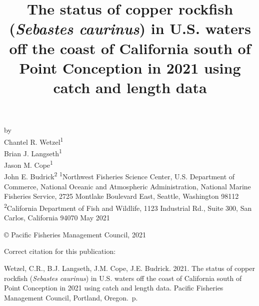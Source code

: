 \documentclass[11pt,
  english,
  a4paper,
]{article}
\date{}
\newcommand{\trTitle}{The status of copper rockfish (\emph{Sebastes caurinus}) in U.S. waters off the coast of California south of Point Conception in 2021 using catch and length data}
\newcommand{\trYear}{2021}
\newcommand{\trMonth}{May}
\newcommand{\trAuthsBack}{Wetzel, C.R., B.J. Langseth, J.M. Cope, J.E. Budrick}
\newcommand{\trCitation}{
\begin{hangparas}{1em}{1}
\trAuthsBack{}. \trYear{}. \trTitle{}. Pacific Fisheries Management Council, Portland, Oregon. \pageref{LastPage}{}\,p.
\end{hangparas}}
\begin{document}

\renewcommand*{\thefootnote}{\fnsymbol{footnote}}

\small
\thispagestyle{empty}
\noindent
\begin{center}
\title{The status of copper rockfish (\emph{Sebastes caurinus}) in U.S. waters off the coast of California south of Point Conception in 2021 using catch and length data}
\vspace{1.5cm}
{\Large\textbf{}}
\vfill
by\\
Chantel R. Wetzel\textsuperscript{1}\\
Brian J. Langseth\textsuperscript{1}\\
Jason M. Cope\textsuperscript{1}\\
John E. Budrick\textsuperscript{2}\vfill
\textsuperscript{1}Northwest Fisheries Science Center, U.S. Department of Commerce, National Oceanic and Atmospheric Administration, National Marine Fisheries Service, 2725 Montlake Boulevard East, Seattle, Washington 98112\\
\textsuperscript{2}California Department of Fish and Wildlife, 1123 Industrial Rd., Suite 300, San Carlos, California 94070\vfill
\trMonth{} \trYear{}
\end{center}
\clearpage

\thispagestyle{empty}
\vspace*{\fill}
\begin{center}
\copyright{} Pacific Fisheries Management Council, \trYear{}\\
\end{center}
\par
\bigskip
\noindent
Correct citation for this publication:
\bigskip
\par
\trCitation{}
\clearpage


\tableofcontents\clearpage
\label{TRlastRoman}
\clearpage

\newpage
\thispagestyle{empty} %
\end{document}
